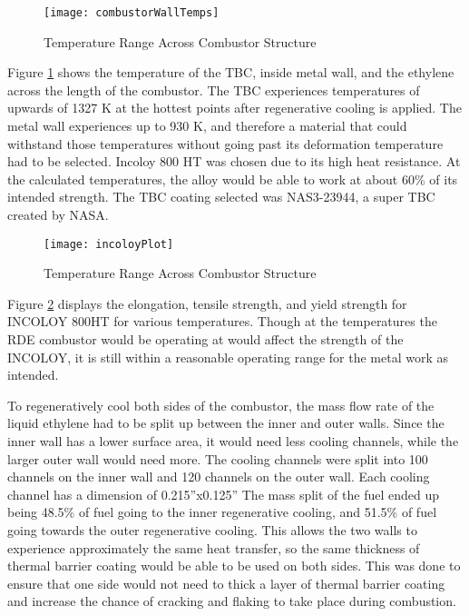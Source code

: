 \begin{figure}[H]
\begin{center}
\texttt{[image: combustorWallTemps]}
\caption{Temperature Range Across Combustor Structure}
\label{fig:combustorWallTemps}
\end{center}
\end{figure}

Figure \ref{fig:combustorWallTemps} shows the temperature of the TBC, inside metal wall, and the ethylene across the length of the combustor. The TBC experiences temperatures of upwards of 1327 K at the hottest points after regenerative cooling is applied. The metal wall experiences up to 930 K, and therefore a material that could withstand those temperatures without going past its deformation temperature had to be selected. Incoloy 800 HT was chosen due to its high heat resistance. At the calculated temperatures, the alloy would be able to work at about 60\% of its intended strength. The TBC coating selected was NAS3-23944, a super TBC created by NASA.

\begin{figure}[H]
\begin{center}
\texttt{[image: incoloyPlot]}
\caption{Temperature Range Across Combustor Structure}
\label{fig:incoloyPlot}
\end{center}
\end{figure}

Figure \ref{fig:incoloyPlot} displays the elongation, tensile strength, and yield strength for INCOLOY 800HT for various temperatures. Though at the temperatures the RDE combustor would be operating at would affect the strength of the INCOLOY, it is still within a reasonable operating range for the metal work as intended.

To regeneratively cool both sides of the combustor, the mass flow rate of the liquid ethylene had to be split up between the inner and outer walls. Since the inner wall has a lower surface area, it would need less cooling channels, while the larger outer wall would need more. The cooling channels were split into 100 channels on the inner wall and 120 channels on the outer wall. Each cooling channel has a dimension of 0.215”x0.125” The mass split of the fuel ended up being 48.5\% of fuel going to the inner regenerative cooling, and 51.5\% of fuel going towards the outer regenerative cooling.  This allows the two walls to experience approximately the same heat transfer, so the same thickness of thermal barrier coating would be able to be used on both sides. This was done to ensure that one side would not need to thick a layer of thermal barrier coating and increase the chance of cracking and flaking to take place during combustion.